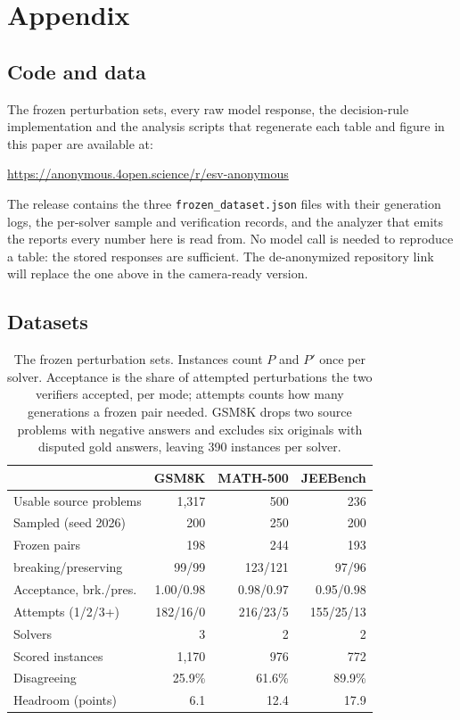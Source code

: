 \documentclass[letterpaper]{article} %
\begin{document}
\section{Appendix}

\subsection{Code and data}
\label{app:code}

The frozen perturbation sets, every raw model response, the decision-rule
implementation and the analysis scripts that regenerate each table and figure in
this paper are available at:

\begin{center}
\small\url{https://anonymous.4open.science/r/esv-anonymous}
\end{center}

\noindent
The release contains the three \texttt{frozen\_dataset.json} files with their
generation logs, the per-solver sample and verification records, and the
analyzer that emits the reports every number here is read from. No model call is
needed to reproduce a table: the stored responses are sufficient. The
de-anonymized repository link will replace the one above in the camera-ready
version.

\subsection{Datasets}
\label{app:data}

\begin{table}[!ht]
\centering
\small
\setlength{\tabcolsep}{3pt}
\begin{tabular}{@{}lrrr@{}}
\toprule
 & GSM8K & MATH-500 & JEEBench \\
\midrule
Usable source problems & 1{,}317 & 500 & 236 \\
Sampled (seed 2026) & 200 & 250 & 200 \\
Frozen pairs & 198 & 244 & 193 \\
\quad breaking/preserving & 99/99 & 123/121 & 97/96 \\
Acceptance, brk./pres. & 1.00/0.98 & 0.98/0.97 & 0.95/0.98 \\
Attempts (1/2/3+) & 182/16/0 & 216/23/5 & 155/25/13 \\
Solvers & 3 & 2 & 2 \\
Scored instances & 1{,}170 & 976 & 772 \\
Disagreeing & 25.9\% & 61.6\% & 89.9\% \\
Headroom (points) & 6.1 & 12.4 & 17.9 \\
\bottomrule
\end{tabular}
\caption{The frozen perturbation sets. Instances count $P$ and $P'$ once per
solver. Acceptance is the share of attempted perturbations the two verifiers
accepted, per mode; attempts counts how many generations a frozen pair needed.
GSM8K drops two source problems with negative answers and excludes six
originals with disputed gold answers, leaving 390 instances per solver.}
\label{tab:datasets}
\end{table}
\end{document}
